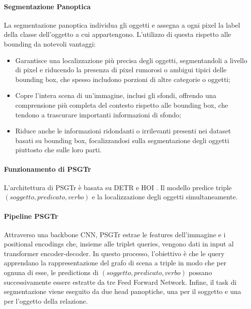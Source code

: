 \paragraph*{Segmentazione Panoptica}
La segmentazione panoptica individua gli oggetti e assegna a ogni pixel la label della classe dell'oggetto a cui appartengono. L'utilizzo di questa rispetto alle bounding da notevoli vantaggi:
\begin{itemize}
	\item Garantisce una localizzazione più precisa degli oggetti, segmentandoli a livello di pixel e riducendo la presenza di pixel rumorosi o ambigui tipici delle bounding box, che spesso includono porzioni di altre categorie o oggetti;
	\item Copre l'intera scena di un'immagine, inclusi gli sfondi, offrendo una comprensione più completa del contesto rispetto alle bounding box, che tendono a trascurare importanti informazioni di sfondo;
	\item Riduce anche le informazioni ridondanti o irrilevanti presenti nei dataset basati su bounding box, focalizzandosi sulla segmentazione degli oggetti piuttosto che sulle loro parti.
\end{itemize}
\paragraph*{Funzionamento di PSGTr}
L'architettura di PSGTr è basata su DETR \cite{detr} e HOI \cite{hoi}. Il modello predice triple $(soggetto, predicato, verbo)$ e la localizzazione degli oggetti simultaneamente.
\paragraph*{Pipeline PSGTr}
Attraverso una \gls{backbone} CNN, PSGTr estrae le features dell'immagine e i positional encodings che, insieme alle triplet queries, vengono dati in input al transformer encoder-decoder. In questo processo, l'obiettivo è che le query apprendano la rappresentazione del grafo di scena a triple in modo che per ognuna di esse, le predictions di  $(soggetto, predicato, verbo)$ possano successivamente essere estratte da tre Feed Forward Network. Infine, il task di segmentazione viene eseguito da due head panoptiche, una per il soggetto e una per l'oggetto della relazione.

